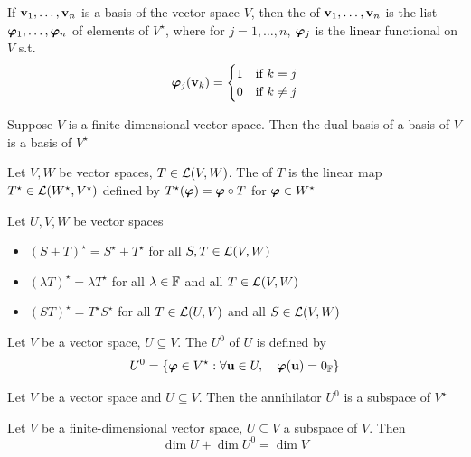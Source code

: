 \documentclass[aspectratio=169]{beamer}
\begin{document}
\begin{frame}
\begin{definition}
If $\mathbf{v}_1,\ldots,\mathbf{v}_n$ is a basis of the vector space $V$, then the  of $\mathbf{v}_1,\ldots,\mathbf{v}_n$ is the list $\bm{\varphi}_1,\ldots,\bm{\varphi}_n$ of elements of $V^\star$, where for $j=1,\ldots,n$, $\bm{\varphi}_j$ is the linear functional on $V$ s.t.
\[
\bm{\varphi}_j(\mathbf{v}_k)=
\begin{cases}
1 & \textrm{if }k=j \\
0 & \textrm{if }k\neq j
\end{cases}
\]
\end{definition}
\vfill
\begin{theorem}
Suppose $V$ is a finite-dimensional vector space. Then the dual basis of a basis of $V$ is a basis of $V^\star$
\end{theorem}
\end{frame}

\begin{frame}
\begin{definition}
Let $V,W$ be vector spaces, $T\in\mathcal{L}(V,W)$. The  of $T$ is the linear map $T^\star\in\mathcal{L}(W^\star,V^\star)$ defined by $T^\star(\bm{\varphi})=\bm{\varphi}\circ T$ for $\bm{\varphi}\in W^\star$
\end{definition}
\vfill
\begin{property}
Let $U,V,W$ be vector spaces
\begin{itemize}
\item $(S+T)^\star =S^\star+T^\star$ for all $S,T\in\mathcal{L}(V,W)$
\item $(\lambda T)^\star=\lambda T^\star$ for all $\lambda\in\mathbb{F}$ and all $T\in\mathcal{L}(V,W)$
\item $(ST)^\star=T^\star S^\star$ for all $T\in\mathcal{L}(U,V)$ and all $S\in\mathcal{L}(V,W)$
\end{itemize}
\end{property}
\end{frame}

\begin{frame}
\begin{definition}[Annihilator]
Let $V$ be a vector space, $U\subseteq V$. The  $U^0$ of $U$ is defined by
\[
U^0=\left\{
\bm{\varphi}\in V^\star: \forall \mathbf{u}\in U,\quad \bm{\varphi}(\mathbf{u})=0_{\mathbb{F}}
\right\}
\]
\end{definition}
\vfill
\begin{theorem}
Let $V$ be a vector space and $U\subseteq V$. Then the annihilator $U^0$ is a subspace of $V^\star$
\end{theorem}
\vfill
\begin{theorem}
Let $V$ be a finite-dimensional vector space, $U\subseteq V$ a subspace of $V$. Then
\[
\dim U+\dim U^0=\dim V
\]
\end{theorem}
\end{frame}
\end{document}
